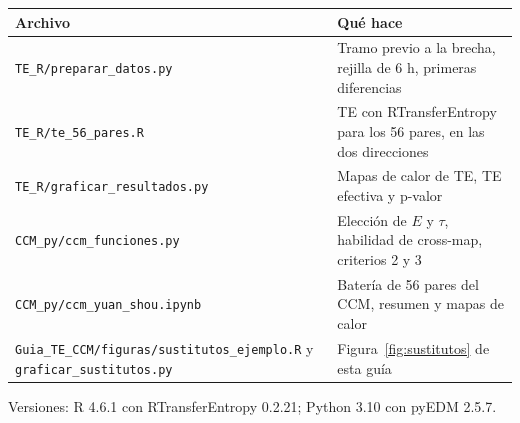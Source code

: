 \documentclass[11pt,openany]{book}
\newcommand{\archivo}[1]{\texttt{\small #1}}
\begin{document}
\begin{center}\small
\begin{tabular}{>{\raggedright}p{6cm}>{\raggedright\arraybackslash}p{8cm}}
\toprule
Archivo & Qué hace \\
\midrule
\archivo{TE\_R/preparar\_datos.py} & Tramo previo a la brecha, rejilla de 6 h, primeras diferencias \\
\archivo{TE\_R/te\_56\_pares.R} & TE con RTransferEntropy para los 56 pares, en las dos direcciones \\
\archivo{TE\_R/graficar\_resultados.py} & Mapas de calor de TE, TE efectiva y p-valor \\
\archivo{CCM\_py/ccm\_funciones.py} & Elección de $E$ y $\tau$, habilidad de cross-map, criterios 2 y 3 \\
\archivo{CCM\_py/ccm\_yuan\_shou.ipynb} & Batería de 56 pares del CCM, resumen y mapas de calor \\
\archivo{Guia\_TE\_CCM/figuras/}\allowbreak\archivo{sustitutos\_ejemplo.R} y \archivo{graficar\_sustitutos.py} & Figura~\ref{fig:sustitutos} de esta guía \\
\bottomrule
\end{tabular}
\end{center}

Versiones: R 4.6.1 con RTransferEntropy 0.2.21; Python 3.10 con pyEDM 2.5.7.
\end{document}
